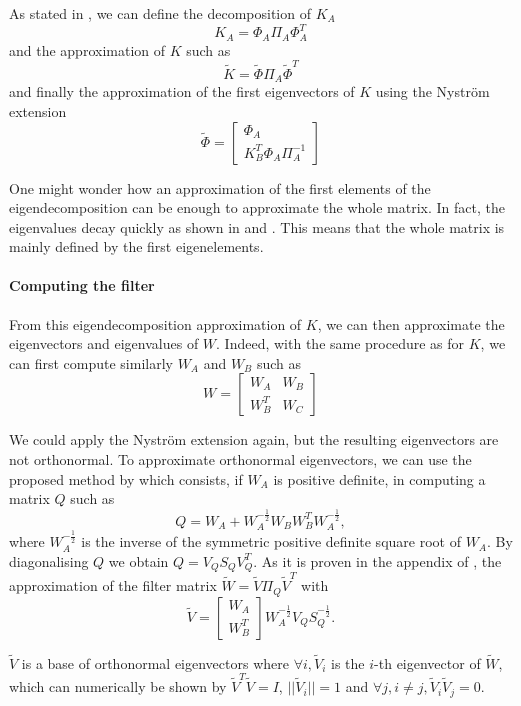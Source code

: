 As stated in \cite{glide_2014}, we can define the decomposition of \(K_A\)
\[K_A = \Phi_A \Pi_A \Phi_A^T\]
and the approximation of \(K\) such as
\[\tilde{K} = \tilde{\Phi} \Pi_A \tilde{\Phi}^T\]
and finally the approximation of the first eigenvectors of \(K\) using the Nystr\"om extension \cite{fowlkes_spectral_2004}
\[
 \tilde{\Phi} = \begin{bmatrix}
  \Phi_A \\
  K_B^T \Phi_A \Pi_A^{-1}
 \end{bmatrix}
\]

One might wonder how an approximation of the first elements of the eigendecomposition can be enough to approximate the whole matrix.
In fact, the eigenvalues decay quickly as shown in \cite{siam_slides_2016} and \cite{meyer_perturbation_2014}.
This means that the whole matrix is mainly defined by the first eigenelements.

\paragraph{Computing the filter}
From this eigendecomposition approximation of \(K\), we can then approximate the eigenvectors and eigenvalues of \(W\).
Indeed, with the same procedure as for \(K\), we can first compute similarly \(W_A\) and \(W_B\) such as
\[
 W = \begin{bmatrix}
  W_A & W_B \\
  W_B^T & W_C
 \end{bmatrix}
\]

We could apply the Nystr\"om extension again, but the resulting eigenvectors are not orthonormal.
To approximate orthonormal eigenvectors, we can use the proposed method by \cite{fowlkes_spectral_2004} which consists, if \(W_A\) is positive definite, in computing a matrix \(Q\) such as
\[Q = W_A + W_A^{-\frac{1}{2}} W_B W_B^T W_A^{-\frac{1}{2}},\]
where \(W_A^{-\frac{1}{2}}\) is the inverse of the symmetric positive definite square root of \(W_A\).
By diagonalising \(Q\) we obtain \(Q = V_Q S_Q V_Q^T\).
As it is proven in the appendix of \cite{fowlkes_spectral_2004}, the approximation of the filter matrix \(\tilde{W} = \tilde{V} \Pi_Q \tilde{V}^T\) with
\[
 \tilde{V} = \begin{bmatrix}
  W_A \\
  W_B^T
 \end{bmatrix}
 W_A^{-\frac{1}{2}} V_Q S_Q^{-\frac{1}{2}}.
\]

\(\tilde{V}\) is a base of orthonormal eigenvectors where \(\forall i, \tilde{V}_i\) is the \(i\)-th eigenvector of \(\tilde{W}\), which can numerically be shown by \(\tilde{V}^T \tilde{V} = I\), \(||\tilde{V}_i|| = 1\) and \(\forall j, i \neq j, \tilde{V}_i \tilde{V}_j = 0\).

